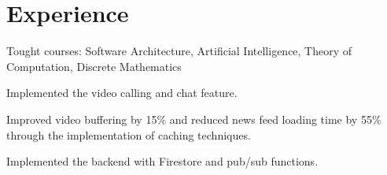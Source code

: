 \documentclass[letterpaper]{deedy-resume} %
\begin{document}
\hfill
%
%
\begin{minipage}[t]{0.66\textwidth} %


\section{Experience}


\vspace{\topsep} %
\begin{tightitemize}
\item Tought courses: Software Architecture, Artificial Intelligence, Theory of Computation, Discrete Mathematics
\end{tightitemize}

\sectionspace %



\begin{tightitemize}
\item Implemented the video calling and chat feature.
\item Improved video buffering by 15\% and reduced news feed loading time by 55\% through the implementation of caching techniques.
\end{tightitemize}

\sectionspace %



\begin{tightitemize}
\item Implemented the backend with Firestore and pub/sub functions. 
\end{tightitemize}



\end{minipage}
\end{document}
